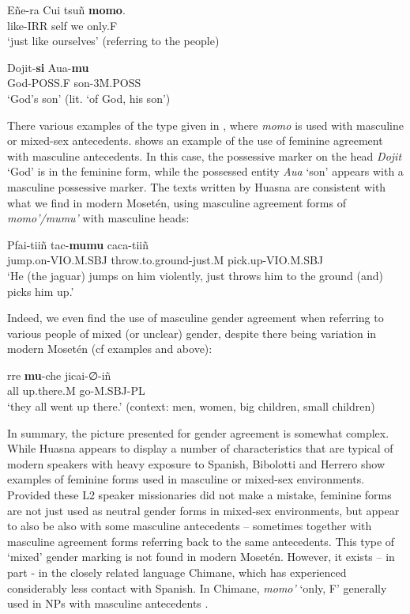 \documentclass[output=paper,colorlinks,citecolor=brown
]{langscibook}
\begin{document}
\ea \label{sakel_example_10}
\gll Eñe-ra 	Cui 	tsuñ 	\textbf{momo}.\\
     like-IRR	self	we	only.\textsc{F}\\
\glt ‘just like ourselves’ (referring to the people)
\z

\ea \label{sakel_example_11}
\gll Dojit-\textbf{si} 	Aua-\textbf{mu}\\
     God-\textsc{POSS.F}	son-3\textsc{M.POSS}\\
\glt ‘God’s son’ (lit. ‘of God, his son’)
\z	

There various examples of the type given in , where \textit{momo} is used with masculine or mixed-sex antecedents.  shows an example of the use of feminine agreement with masculine antecedents. In this case, the possessive marker on the head \textit{Dojit} ‘God’ is in the feminine form, while the possessed entity \textit{Aua} ‘son’ appears with a masculine possessive marker.	
The texts written by Huasna are consistent with what we find in modern Mosetén, using masculine agreement forms of \textit{momo’/mumu’} with masculine heads:

 \ea \label{sakel_example_12}
\gll Pfai-tiiñ		tac-\textbf{mumu}			caca-tiiñ\\
     jump.on-\textsc{VIO.M.SBJ}	throw.to.ground-just.\textsc{M}	pick.up-\textsc{VIO.M.SBJ}\\
\glt ‘He (the jaguar) jumps on him violently, just throws him to the ground (and) picks him up.’
\z	

Indeed, we even find the use of masculine gender agreement when referring to various people of mixed (or unclear) gender, despite there being variation in modern Mosetén (cf examples  and  above):


 \ea \label{sakel_example_13}
\gll rre	\textbf{mu}-che	jicai-∅-iñ\\
     all	up.there.\textsc{M}	go-\textsc{M.SBJ-PL}\\
\glt ‘they all went up there.’ (context: men, women, big children, small children)
\z	

In summary, the picture presented for gender agreement is somewhat complex. While Huasna appears to display a number of characteristics that are typical of modern speakers with heavy exposure to Spanish, Bibolotti and Herrero show examples of feminine forms used in masculine or mixed-sex environments. 
Provided these L2 speaker missionaries did not make a mistake, feminine forms are not just used as neutral gender forms in mixed-sex environments, but appear to also be also with some masculine antecedents – sometimes together with masculine agreement forms referring back to the same antecedents. This type of ‘mixed’ gender marking is not found in modern Mosetén. However, it exists – in part - in the closely related language Chimane, which has experienced considerably less contact with Spanish. In Chimane, \textit{momo’} ‘only, F’ generally used in NPs with masculine antecedents \citep{gill1999pedagogical}.
\end{document}
